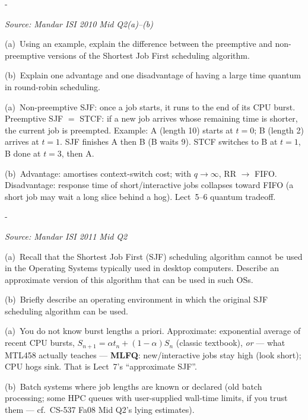 \documentclass[11pt,a4paper]{article}
\makeatletter
\newcommand{\keepspace}[1]{\par\penalty-100\begingroup
  \setlength{\dimen@}{#1}\dimen@ii\pagegoal\advance\dimen@ii-\pagetotal
  \ifdim\dimen@>\dimen@ii\ifdim\dimen@ii>\z@\vfil\fi\break\fi\endgroup}
\newcounter{qn}[section]
\newenvironment{Qn}[4]{%
  \refstepcounter{qn}\keepspace{7\baselineskip}%
  \begin{tcolorbox}[qboxstyle, title={Q\thesection.\theqn\ \ [#1 \textbar\ #2]\ \ #4}]%
  {\footnotesize\color{g3}\textit{Source: #3}}\par\smallskip%
}{%
  \end{tcolorbox}%
}
\newenvironment{Sol}{%
  \begin{tcolorbox}[sboxstyle, title={Solution}]%
}{%
  \end{tcolorbox}\vspace{0.35em}%
}
\makeatother
\begin{document}
\begin{Qn}{Easy-Medium}{Lect 5--6}{Mandar ISI 2010 Mid Q2(a)--(b)}{SJF vs.\ STCF; large RR quantum}
(a)~Using an example, explain the difference between the preemptive and non-preemptive versions of the Shortest Job First scheduling algorithm.

(b)~Explain one advantage and one disadvantage of having a large time quantum in round-robin scheduling.
\end{Qn}
\begin{Sol}
(a)~Non-preemptive SJF: once a job starts, it runs to the end of its CPU burst. Preemptive SJF $=$ STCF: if a new job arrives whose remaining time is shorter, the current job is preempted. Example: A (length 10) starts at $t=0$; B (length 2) arrives at $t=1$. SJF finishes A then B (B waits 9). STCF switches to B at $t=1$, B done at $t=3$, then A.

(b)~Advantage: amortises context-switch cost; with $q\to\infty$, RR $\to$ FIFO. Disadvantage: response time of short/interactive jobs collapses toward FIFO (a short job may wait a long slice behind a hog). Lect~5--6 quantum tradeoff.
\end{Sol}

\begin{Qn}{Medium}{Lect 5--6}{Mandar ISI 2011 Mid Q2}{Approximate SJF on a desktop; where true SJF works}
(a)~Recall that the Shortest Job First (SJF) scheduling algorithm cannot be used in the Operating Systems typically used in desktop computers. Describe an approximate version of this algorithm that can be used in such OSs.

(b)~Briefly describe an operating environment in which the original SJF scheduling algorithm can be used.
\end{Qn}
\begin{Sol}
(a)~You do not know burst lengths a priori. Approximate: exponential average of recent CPU bursts, $S_{n+1}=\alpha t_n+(1-\alpha)S_n$ (classic textbook), \emph{or} --- what MTL458 actually teaches --- \textbf{MLFQ}: new/interactive jobs stay high (look short); CPU hogs sink. That is Lect~7's ``approximate SJF''.

(b)~Batch systems where job lengths are known or declared (old batch processing; some HPC queues with user-supplied wall-time limits, if you trust them --- cf.\ CS-537 Fa08 Mid Q2's lying estimates).
\end{Sol}
\end{document}
